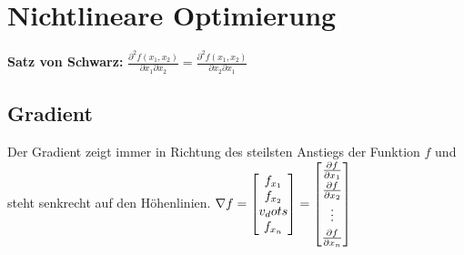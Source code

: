 


\section{Nichtlineare Optimierung}

\textbf{Satz von Schwarz:} $\frac{\partial^2 f(x_1, x_2)}{\partial x_1 \partial x_2} = \frac{\partial^2 f(x_1, x_2)}{\partial x_2 \partial x_1}$

\subsection{Gradient}
Der Gradient zeigt immer in Richtung des steilsten Anstiegs der Funktion $f$ und steht senkrecht auf den Höhenlinien.
$\nabla f =\begin{bmatrix}
f_{x_1}\\
f_{x_2}\\
v_dots\\
f_{x_n}
\end{bmatrix}=\begin{bmatrix}
\frac{\partial f}{\partial x_1}\\[0.1cm]
\frac{\partial f}{\partial x_2}\\[0.1cm]
\vdots\\[0.1cm]
\frac{\partial f}{\partial x_n}
\end{bmatrix}$
 

